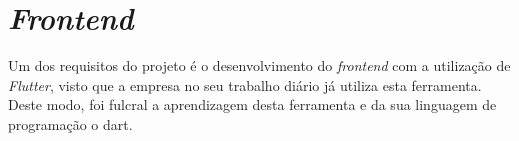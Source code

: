 \section{\textit{Frontend}}
Um dos requisitos do projeto é o desenvolvimento do \textit{frontend} com a utilização de \textit{Flutter}, visto que a empresa no seu trabalho diário já utiliza esta ferramenta. Deste modo, foi fulcral a aprendizagem desta ferramenta e da sua linguagem de programação o dart.



\newpage 



\newpage



